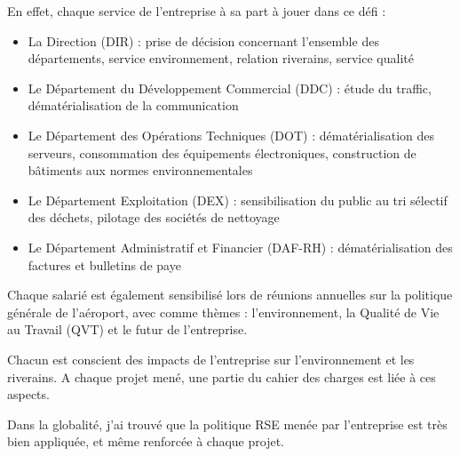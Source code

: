 En effet, chaque service de l'entreprise à sa part à jouer dans ce défi :

\begin{itemize}
    \item La Direction (DIR) : prise de décision concernant l'ensemble des départements, service environnement, relation riverains, service qualité
    \item Le Département du Développement Commercial (DDC) : étude du traffic, dématérialisation de la communication
    \item Le Département des Opérations Techniques (DOT) : dématérialisation des serveurs, consommation des équipements électroniques, construction de bâtiments aux normes environnementales
    \item Le Département Exploitation (DEX) : sensibilisation du public au tri sélectif des déchets, pilotage des sociétés de nettoyage
    \item Le Département Administratif et Financier (DAF-RH) : dématérialisation des factures et bulletins de paye\newline
\end{itemize}

Chaque salarié est également sensibilisé lors de réunions annuelles sur la politique générale de l'aéroport, avec comme thèmes : l'environnement, la Qualité de Vie au Travail (QVT) et le futur de l'entreprise.

Chacun est conscient des impacts de l'entreprise sur l'environnement et les riverains. A chaque projet mené, une partie du cahier des charges est liée à ces aspects.\newline

Dans la globalité, j’ai trouvé que la politique RSE menée par l’entreprise est très bien appliquée, et même renforcée à chaque projet.
